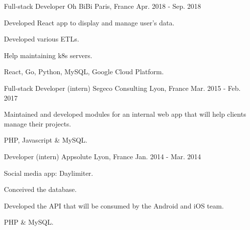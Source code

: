 

\begin{cventries}

  \cventry
  {Full-stack Developer} %
  {Oh BiBi} %
  {Paris, France} %
  {Apr. 2018 - Sep. 2018} %
    {
      \begin{cvitems} %
      \item {Developed React app to display and manage user's data.}
      \item {Developed various ETLs.}
      \item {Help maintaining k8s servers.}
      \item {React, Go, Python, MySQL, Google Cloud Platform.}
      \end{cvitems}
    }

  \cventry
  {Full-stack Developer (intern)} %
  {Segeco Consulting} %
  {Lyon, France} %
  {Mar. 2015 - Feb. 2017} %
    {
      \begin{cvitems} %
      \item {Maintained and developed modules for an internal web app that will help clients manage their projects.}
      \item {PHP, Javascript \& MySQL.}
      \end{cvitems}
    }

  \cventry
  {Developer (intern)} %
  {Appsolute} %
  {Lyon, France} %
  {Jan. 2014 - Mar. 2014} %
    {
      \begin{cvitems} %
      \item {Social media app: Daylimiter.}
      \item {Conceived the database.}
      \item {Developed the API that will be consumed by the Android and iOS team.}
      \item {PHP \& MySQL.}
      \end{cvitems}
    }


\end{cventries}
